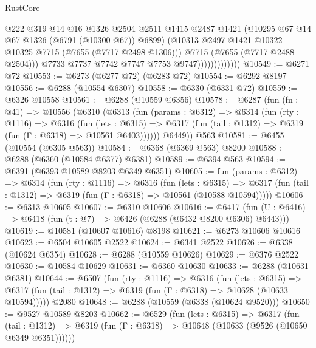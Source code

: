 \begin{lexlean}{RustCore}
\begin{coremodule}
                                @222
                                @319
                                @14
                                @16
                                @1326
                                @2504
                                @2511
                                @1415
                                @2487
                                @1421
                                (@10295 @67 @14 @67 @1326 (@6791 (@10300 @67)) @6899)
                                (@10313 @2497 @1421 @10322 @10325 @7715 (@7655 (@7717 @2498 @1306)))
                                @7715
                                (@7655 (@7717 @2488 @2504)))
                              @7733
                              @7737
                              @7742
                              @7747
                              @7753
                              @9747)))))))))))))
@10549 := @6271 @72
@10553 := @6273 (@6277 @72) (@6283 @72)
@10554 := @6292 @8197
@10556 := @6288 (@10554 @6307)
@10558 := @6330 (@6331 @72)
@10559 := @6326 @10558
@10561 := @6288 (@10559 @6356)
@10578 := @6287
    (fun (fn : @41) =>
    @10556
      (@6310
        (@6313
          (fun (params : @6312) =>
          @6314
            (fun (rty : @1116) =>
            @6316
              (fun (lets : @6315) =>
              @6317 (fun (tail : @1312) => @6319 (fun (Γ : @6318) => @10561 @6403))))))
        @6449))
    @563
@10581 := @6455 (@10554 (@6305 @563))
@10584 := @6368 (@6369 @563) @8200
@10588 := @6288 (@6360 (@10584 @6377) @6381)
@10589 := @6394 @563
@10594 := @6391 (@6393 @10589 @8203 @6349 @6351)
@10605 := fun (params : @6312) =>
  @6314
    (fun (rty : @1116) =>
    @6316
      (fun (lets : @6315) =>
      @6317 (fun (tail : @1312) => @6319 (fun (Γ : @6318) => @10561 (@10588 @10594)))))
@10606 := @6313 @10605
@10607 := @6310 @10606
@10616 := @6417 (fun (U : @6416) => @6418 (fun (t : @7) => @6426 (@6288 (@6432 @8200 @6306) @6443)))
@10619 := @10581 (@10607 @10616) @8198
@10621 := @6273 @10606 @10616
@10623 := @6504 @10605 @2522
@10624 := @6341 @2522
@10626 := @6338 (@10624 @6354)
@10628 := @6288 (@10559 @10626)
@10629 := @6376 @2522
@10630 := @10584 @10629
@10631 := @6360 @10630
@10633 := @6288 (@10631 @6381)
@10644 := @6507
    (fun (rty : @1116) =>
    @6316
      (fun (lets : @6315) =>
      @6317 (fun (tail : @1312) => @6319 (fun (Γ : @6318) => @10628 (@10633 @10594)))))
    @2080
@10648 := @6288 (@10559 (@6338 (@10624 @9520)))
@10650 := @9527 @10589 @8203
@10662 := @6529
    (fun (lets : @6315) =>
    @6317
      (fun (tail : @1312) =>
      @6319 (fun (Γ : @6318) => @10648 (@10633 (@9526 (@10650 @6349 @6351))))))

\end{coremodule}
\end{lexlean}
